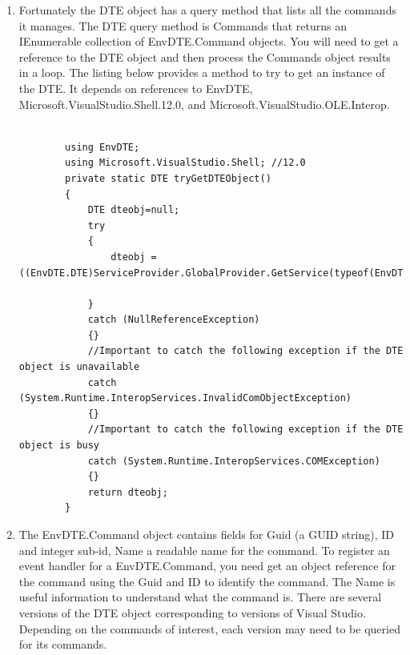 \begin{enumerate}
\item

Fortunately the DTE object has a query method that lists all the commands it manages.   The DTE query method is Commands that returns an IEnumerable collection of EnvDTE.Command objects.  You will need to get a reference to the DTE object and then process the Commands object results in a loop.  The listing below provides a method to try to get an instance of the DTE.  It depends on references to EnvDTE, Microsoft.VisualStudio.Shell.12.0, and Microsoft.VisualStudio.OLE.Interop.  

\begin{lstlisting}

		using EnvDTE;
		using Microsoft.VisualStudio.Shell; //12.0
		private static DTE tryGetDTEObject()
		{
			DTE dteobj=null;
			try
			{
				dteobj = ((EnvDTE.DTE)ServiceProvider.GlobalProvider.GetService(typeof(EnvDTE.DTE).GUID)).DTE;

			}
			catch (NullReferenceException)
			{}
			//Important to catch the following exception if the DTE object is unavailable
			catch (System.Runtime.InteropServices.InvalidComObjectException)
			{} 
			//Important to catch the following exception if the DTE object is busy
			catch (System.Runtime.InteropServices.COMException)
			{}
			return dteobj;
		}

\end{lstlisting}

\item
The EnvDTE.Command object contains fields for Guid (a GUID string), ID and integer sub-id, Name a readable name for the command.  To register an event handler for a EnvDTE.Command, you need get an object reference for the command using the Guid and ID to identify the command. The Name is useful information to understand what the command is.    There are several versions of the DTE object corresponding to versions of Visual Studio.  Depending on the commands of interest, each version may need to be queried for its commands.  

\end{enumerate}


